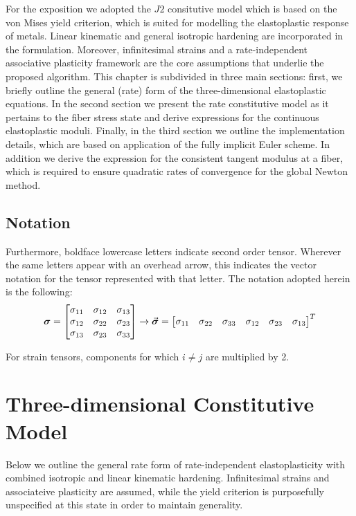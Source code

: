 For the exposition we adopted the $J2$ consitutive model which is based on the 
von Mises yield criterion, which is suited for modelling the elastoplastic 
response of metals. Linear kinematic and general isotropic hardening are 
incorporated in the formulation. Moreover, infinitesimal strains and a 
rate-independent associative plasticity framework are the core assumptions that 
underlie the proposed algorithm. This chapter is subdivided in three main 
sections: first, we briefly outline the general (rate) form of the 
three-dimensional elastoplastic equations. In the second section we present the 
rate constitutive model as it pertains to the fiber stress state and derive 
expressions for the continuous elastoplastic moduli. Finally, in the third 
section we outline the implementation details, which are based on application 
of the fully implicit Euler scheme. In addition we derive the expression for 
the consistent tangent modulus at a fiber, which is required to ensure 
quadratic rates of convergence for the global Newton method.

\subsection{Notation}
Furthermore, boldface lowercase letters indicate second order tensor. Wherever 
the same letters appear with an overhead arrow, this indicates the vector 
notation for the tensor represented with that letter. The notation adopted 
herein is the following:
\begin{equation*}
	\boldsymbol{\sigma} = \begin{bmatrix}
		\sigma_{11} & \sigma_{12} & \sigma_{13} \\
		\sigma_{12} & \sigma_{22} & \sigma_{23} \\
		\sigma_{13} & \sigma_{23} & \sigma_{33} \\
	\end{bmatrix}\rightarrow \vec{\boldsymbol{\sigma}} = \begin{bmatrix}
	\sigma_{11} & \sigma_{22} & \sigma_{33} & \sigma_{12} & \sigma_{23} & 
	\sigma_{13}
\end{bmatrix}^T
\end{equation*}

For strain tensors, components for which $i\neq j$ are multiplied by 2.

\section{Three-dimensional Constitutive Model}\label{section:CH3-S2}
Below we outline the general rate form of rate-independent elastoplasticity 
with combined isotropic and linear kinematic hardening. Infinitesimal strains 
and associateive plasticity are assumed, while the yield criterion is 
purposefully unspecified at this state in order to maintain generality. 

